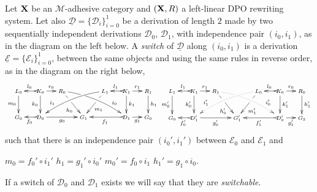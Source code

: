 \documentclass[a4paper,UKenglish,cleveref,pdftex, thm-restate,numberwithinsect,anonymous]{lipics}
\def\R{\mathsf{R}}
\def\X{\textbf {\textup{X}}}
\def\G{\textbf {\textup{G}}}
\newcommand{\dder}[1]{\mathscr{#1}}
\newcommand{\der}[1]{\underline{\dder{#1}}}
\begin{document}
\begin{definition}[Switch]
  \label{def:switch}
  Let $\X$ be an $\mathcal{M}$-adhesive category 
  and $(\X, \R)$ a left-linear DPO rewriting system. 
  Let also
  $\der{D}=\{\dder{D}_i\}_{i=0}^1$ be a derivation of length $2$ made
  by two sequentially independent derivations $\dder{D}_0$,
  $\dder{D}_1$, with independence pair $(i_0, i_1)$, as in the diagram
  on the left below. A \emph{switch} of $\der{D}$ along $(i_0,i_1)$ is
  a derivation $\der{E}=\{\dder{E}_i\}_{i=0}^1$, between the same objects and using the same rules
  in reverse order, as in the diagram on the right below, 
  \[
    \def\objectstyle{\scriptstyle}\def\labelstyle{\scriptstyle}
    \xymatrix@C=1.1mm@R=8mm{
      {L_0} \ar[d]_{m_0}
      & & {K_0} \ar@{>->}[ll]_{l_0} \ar[rr]^{r_0} \ar[d]_{k_0}
      & & {R_0} \ar[drr]|(.35)\hole_(.6){h_0}  \ar@/^.22cm/[drrrrrr]|(.3)\hole^(.75){i_0}
      & & & & 
      {L_1}\ar[dll]|(.35)\hole^(.6){m_1} \ar@/_.22cm/_(.75){i_1}[dllllll]
      & & {K_1} \ar@{>->}[ll]_{l_1} \ar[rr]^{r_1} \ar[d]^{k_1}
      & & {R_1} \ar[d]^{h_1} \\
      {G_0}
      & & {D_0} \ar@{>->}[ll]^{f_0} \ar[rrrr]_{g_0}
      & & & & {G_1} & &
      & &  {D_1} \ar@{>->}[llll]^{f_1} \ar[rr]_{g_1}
      & & {G_0}
    }
    \xymatrix@C=1.1mm@R=8mm{
      {L_1} \ar[d]_{m_0'}
      & & {K_1} \ar@{>->}[ll]_{l_1} \ar[rr]^{r_1} \ar[d]_{k_0'}
      & & {R_1} \ar[drr]|(.35)\hole_(.6){h_0'}  \ar@/^.22cm/@{.>}^(.75){i_0'}|(.3)\hole[drrrrrr]
      & & & & 
      {L_0}\ar[dll]|(.35)\hole^(.6){m_1'} \ar@/_.22cm/@{.>}_(.75){i_1'}[dllllll] 
      & & {K_0} \ar@{>->}[ll]_{l_0} \ar[rr]^{r_0} \ar[d]^{k_1'}
      & & {R_0} \ar[d]^{h_1'} \\
      {G_0}
      & & {D_1'} \ar@{>->}[ll]^{f_0'} \ar[rrrr]_{g_0'}
      & & & & {G'_1} & &
      & &  {D_0'} \ar@{>->}[llll]^{f_1'} \ar[rr]_{g_1'}
      & & {G_2}  }
  \]
  such that there is an independence pair $(i_0', i_1')$ between
  $\dder{E}_0$ and $\dder{E}_1$ and 
  \begin{center}   
    $m_0=f_0' \circ i_1'$
    \qquad $h_1=g_1' \circ i_0'$
    \qquad $m_0'= f_0 \circ i_1$
    \qquad $h_1'= g_{1}\circ i_0$.
  \end{center}


  If a switch of $\dder{D}_0$ and $\dder{D}_1$ exists we will say that
  they are \emph{switchable}.



\end{definition}
\end{document}
